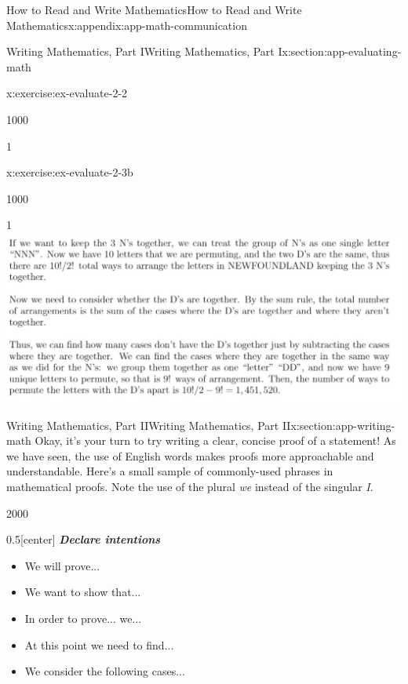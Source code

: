 \documentclass[oneside,10pt,]{book}
\newcommand{\alert}[1]{\textbf{\textit{#1}}}
\numberwithin{equation}{section}
\begin{document}
\begin{appendixptx}{How to Read and Write Mathematics}{}{How to Read and Write Mathematics}{}{}{x:appendix:app-math-communication}
\begin{sectionptx}{Writing Mathematics, Part I}{}{Writing Mathematics, Part I}{}{}{x:section:app-evaluating-math}
\begin{inlineexercise}{}{x:exercise:ex-evaluate-2-2}
\begin{sidebyside}{1}{0}{0}{0}
\begin{sbspanel}{1}
\end{sbspanel}%
\end{sidebyside}%
\end{inlineexercise}%
\begin{inlineexercise}{}{x:exercise:ex-evaluate-2-3b}%
\begin{sidebyside}{1}{0}{0}{0}%
\begin{sbspanel}{1}%
\includegraphics[width=\linewidth]{images/Sept23-newfoundland-3b.png}
\end{sbspanel}%
\end{sidebyside}%
\end{inlineexercise}%
\end{sectionptx}
%
%
\typeout{************************************************}
\typeout{************************************************}
%
\begin{sectionptx}{Writing Mathematics, Part II}{}{Writing Mathematics, Part II}{}{}{x:section:app-writing-math}
Okay, it's your turn to try writing a clear, concise proof of a statement! As we have seen, the use of English words makes proofs more approachable and understandable. Here's a small sample of commonly-used phrases in mathematical proofs. Note the use of the plural \emph{we} instead of the singular \emph{I}.%
\begin{sidebyside}{2}{0}{0}{0}%
\begin{sbspanel}{0.5}[center]%
\alert{Declare intentions}%
\begin{itemize}[label=\textbullet]
\item{}We will prove...%
\item{}We want to show that...%
\item{}In order to prove... we...%
\item{}At this point we need to find...%
\item{}We consider the following cases...%
\end{itemize}
%
\end{sbspanel}%

\end{sidebyside}
\end{sectionptx}
\end{appendixptx}
\end{document}
